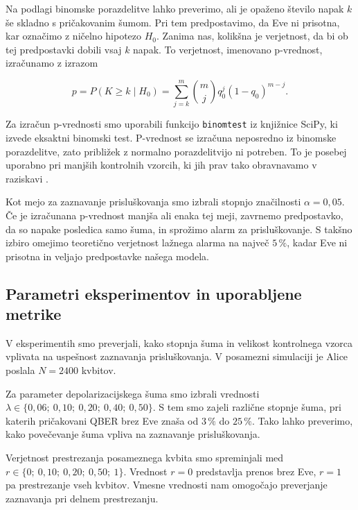 Na podlagi binomske porazdelitve lahko preverimo, ali je
opaženo število napak $k$ še skladno s pričakovanim šumom.
Pri tem predpostavimo, da Eve ni prisotna, kar označimo
z ničelno hipotezo $H_0$. Zanima nas, kolikšna je
verjetnost, da bi ob tej predpostavki dobili vsaj
$k$ napak. To verjetnost, imenovano p-vrednost,
izračunamo z izrazom

\begin{equation}
    p = P(K \geq k \mid H_0)
      = \sum_{j=k}^{m}
        \binom{m}{j}q_0^j(1-q_0)^{m-j}.
    \label{g22:eq:p-value}
\end{equation}

Za izračun p-vrednosti smo uporabili funkcijo
\texttt{binomtest} iz knjižnice SciPy, ki izvede
eksaktni binomski test. P-vrednost se izračuna
neposredno iz binomske porazdelitve, zato
približek z normalno porazdelitvijo ni potreben.
To je posebej uporabno pri manjših kontrolnih
vzorcih, ki jih prav tako obravnavamo v raziskavi
\cite{g22:scipy-binomtest}.

Kot mejo za zaznavanje prisluškovanja smo izbrali
stopnjo značilnosti $\alpha=0{,}05$. Če je izračunana
p-vrednost manjša ali enaka tej meji, zavrnemo
predpostavko, da so napake posledica samo šuma,
in sprožimo alarm za prisluškovanje. S takšno
izbiro omejimo teoretično verjetnost lažnega
alarma na največ $5\,\%$, kadar Eve ni prisotna
in veljajo predpostavke našega modela.



\subsection{Parametri eksperimentov in uporabljene metrike}
\label{g22:sec:poskusi}
\label{g22:sec:metrike}

    
    
    V eksperimentih smo preverjali, kako stopnja šuma
    in velikost kontrolnega vzorca vplivata na
    uspešnost zaznavanja prisluškovanja.
    V posamezni simulaciji je Alice poslala
    $N=2400$ kvbitov.

    Za parameter depolarizacijskega šuma smo izbrali
    vrednosti
    $\lambda \in \{0{,}06;\ 0{,}10;\ 0{,}20;\
    0{,}40;\ 0{,}50\}$.
    S tem smo zajeli različne stopnje šuma, pri
    katerih pričakovani QBER brez Eve znaša od
    $3\,\%$ do $25\,\%$. Tako lahko preverimo,
    kako povečevanje šuma vpliva na zaznavanje
    prisluškovanja.


    Verjetnost prestrezanja posameznega kvbita
    smo spreminjali med
    $r \in \{0;\ 0{,}10;\ 0{,}20;\ 0{,}50;\ 1\}$.
    Vrednost $r=0$ predstavlja prenos brez Eve,
    $r=1$ pa prestrezanje vseh kvbitov.
    Vmesne vrednosti nam omogočajo preverjanje
    zaznavanja pri delnem prestrezanju.

